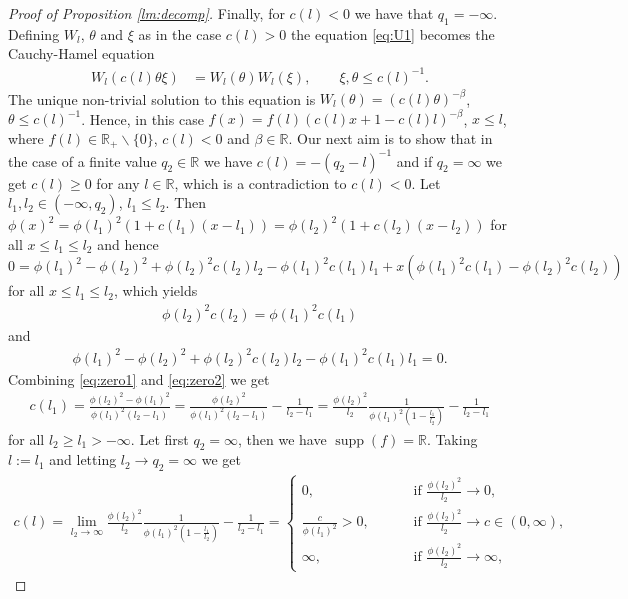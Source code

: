 \documentclass[11pt,a4paper]{article}
\theoremstyle{plain}
\theoremstyle{definition}
\theoremstyle{remark}
\DeclareMathOperator\supp{supp}
\def\RR{\mathbb{R}}
\newcommand{\bsl}{\backslash}
\begin{document}
\begin{proof}[Proof of Proposition \ref{lm:decomp}]
    Finally, for $c(l)<0$ we have that $q_1=-\infty$. Defining $W_l$, $\theta$ and $\xi$ as in the case $c(l)>0$ the equation \eqref{eq:U1} becomes the Cauchy-Hamel equation
    \begin{align*}
        W_l(c(l)\theta\xi)&=W_l(\theta)W_l(\xi), \qquad \xi, \theta \leq  c(l)^{-1}.
    \end{align*}
    The unique non-trivial solution to this equation is $W_l(\theta)=(c(l)\theta)^{-\beta}$, $\theta \leq c(l)^{-1}$. Hence, in this case $f(x)=f(l)(c(l)x+1-c(l)l)^{-\beta}$, $x\le l$, where $f(l) \in \RR_+\bsl\{0\}$, $c(l)<0$ and $\beta \in \RR$. Our next aim is to show that in the case of a finite value $q_2\in\RR$ we have $c(l)=-(q_2-l)^{-1}$ and if $q_2=\infty$ we get $c(l)\ge 0$ for any $l\in\RR$, which is a contradiction to $c(l)<0$. Let $l_1,l_2\in (-\infty, q_2)$, $l_1\le l_2$. Then $\phi(x)^2=\phi(l_1)^2(1+c(l_1)(x-l_1))=\phi(l_2)^2(1+c(l_2)(x-l_2))$ for all $x\le l_1\le l_2$ and hence
    \[
        0 = \phi(l_1)^2-\phi(l_2)^2+\phi(l_2)^2c(l_2)l_2-\phi(l_1)^2c(l_1)l_1+x(\phi(l_1)^2c(l_1)-\phi(l_2)^2c(l_2))
    \]
    for all $x\le l_1\le l_2$, which yields 
    \begin{align}\label{eq:zero1}
        \phi(l_2)^2c(l_2)=\phi(l_1)^2c(l_1)
    \end{align}
    and 
    \begin{align}\label{eq:zero2}
        \phi(l_1)^2-\phi(l_2)^2+\phi(l_2)^2c(l_2)l_2-\phi(l_1)^2c(l_1)l_1 = 0.    
    \end{align}
    Combining \eqref{eq:zero1} and \eqref{eq:zero2} we get
    \begin{align}\label{eq:cprime}
        c(l_1)=\frac{\phi(l_2)^2-\phi(l_1)^2}{\phi(l_1)^2(l_2-l_1)}=\frac{\phi(l_2)^2}{\phi(l_1)^2(l_2-l_1)}-\frac{1}{l_2-l_1}=\frac{\phi(l_2)^2}{l_2}\frac{1}{\phi(l_1)^2(1-\frac{l_1}{l_2})}-\frac{1}{l_2-l_1}    
    \end{align}
    for all $l_2\ge l_1 > -\infty$.
    Let first $q_2=\infty$, then we have $\supp (f) = \RR$. Taking $l:=l_1$ and letting $l_2\to q_2=\infty$ we get
    \begin{align*}
        c(l)=\lim_{l_2\to \infty} \frac{\phi(l_2)^2}{l_2}\frac{1}{\phi(l_1)^2(1-\frac{l_1}{l_2})}-\frac{1}{l_2-l_1} = \begin{cases}
            0, \qquad &\text{ if } \frac{\phi(l_2)^2}{l_2} \to 0,\\
            \frac{c}{\phi(l_1)^2}>0, \qquad &\text{ if } \frac{\phi(l_2)^2}{l_2} \to c\in(0,\infty),\\
            \infty, \qquad &\text{ if } \frac{\phi(l_2)^2}{l_2} \to \infty,

\end{cases}
\end{align*}
\end{proof}
\end{document}
